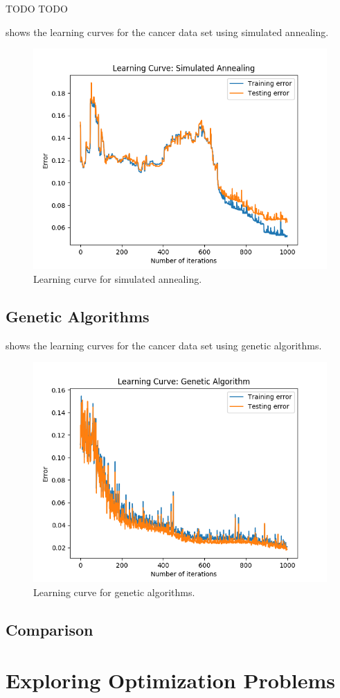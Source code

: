 \documentclass{article}
\begin{document}
  TODO TODO

   shows the learning curves for the cancer data set using simulated annealing.

  \begin{figure}[htb]
  \centering
  \includegraphics[width=.5\linewidth]{out/plot/SA.png}
  \caption{Learning curve for simulated annealing.}
  \label{fig:sa-learning}
  \end{figure}

  \subsection{Genetic Algorithms}

   shows the learning curves for the cancer data set using genetic algorithms.

  \begin{figure}[htb]
  \centering
  \includegraphics[width=.5\linewidth]{out/plot/GA.png}
  \caption{Learning curve for genetic algorithms.}
  \label{fig:ga-learning}
  \end{figure}

  \subsection{Comparison}

  \section{Exploring Optimization Problems}
\end{document}
